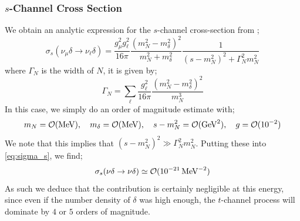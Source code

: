 \vspace{-0.5cm}

\subsubsection{$s$-Channel Cross Section}\label{sec:schannel}
We obtain an analytic expression for the $s$-channel cross-section from \cite{Franarin2018};
\begin{equation}
  \sigma_s(\nu_\mu\delta \rightarrow \nu_\ell \delta) = \frac{g_\mu^2 g_\ell^2}{16\pi}\frac{(m_N^2 - m_\delta^2)^2}{m_N^2 + m_\delta^2} \frac{1}{(s - m_N^2)^2 + \Gamma_N^2 m_N^2}
\end{equation}
where $\Gamma_N$ is the width of $N$, it is given by;
\begin{equation}\label{eq:sigma_s}
  \Gamma_N = \sum_{\ell}{\frac{g_\ell^2}{16\pi} \frac{(m_N^2 - m_\delta^2)^2}{m_N^3}}
\end{equation}
In this case, we simply do an order of magnitude estimate with;
\begin{equation}
  m_N = \mathcal{O}(\textrm{MeV}), \quad m_\delta = \mathcal{O}(\textrm{MeV}), \quad s - m_N^2 = \mathcal{O}(\textrm{GeV}^2), \quad g = \mathcal{O}(10^{-2})
\end{equation}
We note that this implies that $(s - m_N^2)^2 \gg \Gamma_N^2 m_N^2$. Putting these into \eqref{eq:sigma_s}, we find;
\begin{equation}
  \sigma_s(\nu\delta \rightarrow \nu\delta) \simeq \mathcal{O}(10^{-21}\,\textrm{MeV}^{-2})
\end{equation}
As such we deduce that the contribution is certainly negligible at this energy, since even if the number density of $\delta$ was high enough, the $t$-channel process will dominate by $4$ or $5$ orders of magnitude. 

